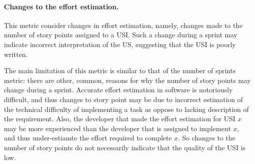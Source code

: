 \paragraph{Changes to the effort estimation.}
This metric consider changes in effort estimation, namely, changes made to the number of story points assigned to a USI. 
Such a change during a sprint may indicate incorrect interpretation of the US, suggesting that the USI is poorly written. 


The main limitation of this metric is similar to that of the number of sprints metric: there are other, common, reasons for why the number of story points may change during a sprint. 
Accurate effort estimation in software is notoriously difficult, and thus changes to story point may be due to incorrect estimation of the technical difficulty of implementing a task as oppose to lacking description of the requirement. 
Also, the developer that made the effort estimation for USI $x$ may be more experienced than the developer that is assigned to implement $x$, and thus under-estiamte the effort required to complete $x$. 
So changes to the number of story points do not necessarily indicate that the quality of the USI  is low. 


